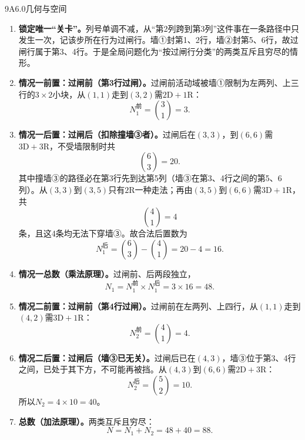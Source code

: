 \begin{solution}{9}{A}{6.0}{几何与空间}

\begin{enumerate}[label=\textbf{Step \arabic*:},leftmargin=*]
  \item \textbf{锁定唯一“关卡”。}列号单调不减，从“第2列跨到第3列”这件事在一条路径中只发生一次，记该步所在行为过闸行。墙①封第1、2行，墙②封第5、6行，故过闸行属于第3、4行。于是全局问题化为“按过闸行分类”的两类互斥且穷尽的情形。

  \item \textbf{情况一前置：过闸前（第3行过闸）。}过闸前活动域被墙①限制为左两列、上三行的\(3\times2\)小块，从\((1,1)\)走到\((3,2)\)需\(2\mathrm D+1\mathrm R\)：
  \[
    N_1^{\text{前}}=\binom31=3.
  \]

  \item \textbf{情况一后置：过闸后（扣除撞墙③者）。}过闸后在\((3,3)\)，到\((6,6)\)需\(3\mathrm D+3\mathrm R\)，不受墙限制时共
  \[
    \binom63=20.
  \]
  其中撞墙③的路径必在第3行先到达第5列（墙③在第3、4行之间的第5、6列）。从\((3,3)\)到\((3,5)\)只有\(2\mathrm R\)一种走法；再由\((3,5)\)到\((6,6)\)需\(3\mathrm D+1\mathrm R\)，共
  \[
    \binom41=4
  \]
  条，且这4条均无法下穿墙③。故合法后置数为
  \[
    N_1^{\text{后}}=\binom63-\binom41=20-4=16.
  \]

  \item \textbf{情况一总数（乘法原理）。}过闸前、后两段独立，
  \[
    N_1=N_1^{\text{前}}\times N_1^{\text{后}}=3\times16=48.
  \]

  \item \textbf{情况二前置：过闸前（第4行过闸）。}过闸前在左两列、上四行，从\((1,1)\)走到\((4,2)\)需\(3\mathrm D+1\mathrm R\)：
  \[
    N_2^{\text{前}}=\binom41=4.
  \]

  \item \textbf{情况二后置：过闸后（墙③已无关）。}过闸后已在\((4,3)\)，墙③位于第3、4行之间，已处于其下方，不可能再被挡。从\((4,3)\)到\((6,6)\)需\(2\mathrm D+3\mathrm R\)：
  \[
    N_2^{\text{后}}=\binom52=10.
  \]
  所以\(N_2=4\times10=40\)。

  \item \textbf{总数（加法原理）。}两类互斥且穷尽：
  \[
    N=N_1+N_2=48+40=\boxed{88}.
  \]
\end{enumerate}

\end{solution}

